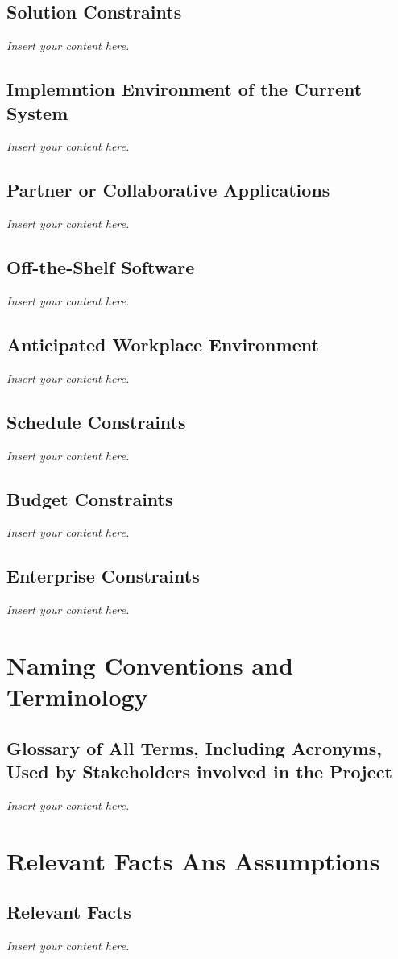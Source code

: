 \documentclass[a4paper, 12pt,twoside]{article}
\newcommand{\lips}{\textit{Insert your content here.}}
\begin{document}
\subsection{Solution Constraints}
\lips
\subsection{Implemntion Environment of the Current System}
\lips
\subsection{Partner or Collaborative Applications}
\lips
\subsection{Off-the-Shelf Software}
\lips
\subsection{Anticipated Workplace Environment}
\lips
\subsection{Schedule Constraints}
\lips
\subsection{Budget Constraints}
\lips
\subsection{Enterprise Constraints}
\lips

\section{Naming Conventions and Terminology}
\subsection{Glossary of All Terms, Including Acronyms, Used by Stakeholders involved in the Project}
\lips

\section{Relevant Facts Ans Assumptions}
\subsection{Relevant Facts}
\lips
\end{document}
